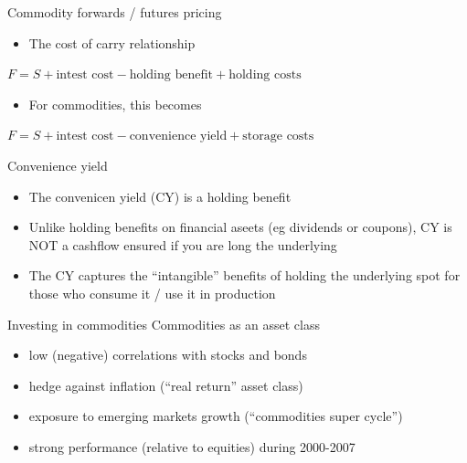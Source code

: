 \documentclass[
  ignorenonframetext,
  aspectratio=169]{beamer}
\providecommand{\tightlist}{%
  \setlength{\itemsep}{0pt}\setlength{\parskip}{0pt}}
\begin{document}
\begin{frame}{Commodity forwards / futures pricing}
\protect\hypertarget{commodity-forwards-futures-pricing}{}
\begin{itemize}
\tightlist
\item
  The cost of carry relationship
\end{itemize}

\(F = S + \text{intest cost} - \text{holding benefit} + \text{holding costs}\)

\begin{itemize}
\tightlist
\item
  For commodities, this becomes
\end{itemize}

\(F = S + \text{intest cost} - \text{convenience yield} + \text{storage costs}\)

Convenience yield

\begin{itemize}
\tightlist
\item
  The convenicen yield (CY) is a holding benefit
\item
  Unlike holding benefits on financial aseets (eg dividends or coupons),
  CY is NOT a cashflow ensured if you are long the underlying
\item
  The CY captures the ``intangible'' benefits of holding the underlying
  spot for those who consume it / use it in production
\end{itemize}
\end{frame}

\begin{frame}{Investing in commodities}
\protect\hypertarget{investing-in-commodities}{}
Commodities as an asset class

\begin{itemize}
\tightlist
\item
  low (negative) correlations with stocks and bonds
\item
  hedge against inflation (``real return'' asset class)
\item
  exposure to emerging markets growth (``commodities super cycle'')
\item
  strong performance (relative to equities) during 2000-2007
\end{itemize}
\end{frame}
\end{document}
